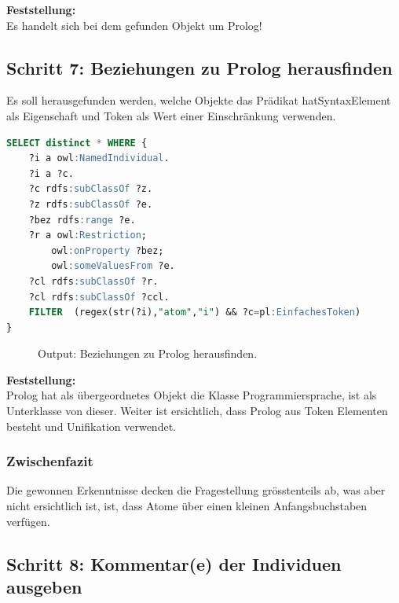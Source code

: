 \textbf{Feststellung:}\\  Es handelt sich bei dem gefunden Objekt um Prolog!

\subsection{Schritt 7: Beziehungen zu Prolog herausfinden}
\label{ssec:anh_beispiel_f_7}

Es soll herausgefunden werden, welche Objekte das Prädikat hatSyntaxElement als Eigenschaft und Token als Wert einer Einschränkung verwenden.


\begin{lstlisting}[caption={Beziehungen zu Prolog herausfinden},captionpos=b,language=SQL]
SELECT distinct * WHERE { 
	?i a owl:NamedIndividual.
	?i a ?c.
	?c rdfs:subClassOf ?z.
	?z rdfs:subClassOf ?e.
	?bez rdfs:range ?e.
	?r a owl:Restriction;
		owl:onProperty ?bez;
		owl:someValuesFrom ?e.
	?cl rdfs:subClassOf ?r.
	?cl rdfs:subClassOf ?ccl.
	FILTER  (regex(str(?i),"atom","i") && ?c=pl:EinfachesToken)
}
\end{lstlisting}

\begin{figure}[H]
\centering {}
\caption{Output: Beziehungen zu Prolog herausfinden.\label{fig:atom_7}\protect\footnotemark}
\end{figure}

\textbf{Feststellung:}\\  Prolog hat als übergeordnetes Objekt die Klasse Programmiersprache, ist als Unterklasse von dieser. Weiter ist ersichtlich, dass Prolog aus Token Elementen besteht und Unifikation verwendet.

\subsubsection{Zwischenfazit}
\label{sssec:anh_beispiel_c_7_1}

Die gewonnen Erkenntnisse decken die Fragestellung grösstenteils ab, was aber nicht ersichtlich ist, ist, dass Atome über einen kleinen Anfangsbuchstaben verfügen.

\subsection{Schritt 8: Kommentar(e) der Individuen ausgeben}
\label{ssec:anh_beispiel_f_8}

